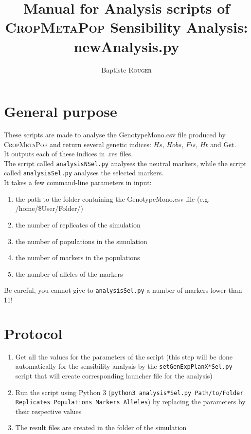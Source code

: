 \documentclass[10pt,a4paper]{article}
\title{Manual for Analysis scripts of \textsc{CropMetaPop} Sensibility Analysis:\\ \textbf{newAnalysis.py}}
\author{Baptiste \textsc{Rouger}}
\begin{document}
\maketitle
\section{General purpose}
These scripts are made to analyse the GenotypeMono.csv file produced by \textsc{CropMetaPop} and return several genetic indices: $\overline{H}s$, $\overline{H}obs$, $\overline{F}is$, $Ht$ and Gst.\\
It outputs each of these indices in .res files.\\

The script called \texttt{analysisNSel.py} analyses the neutral markers, while the script called \texttt{analysisSel.py} analyses the selected markers.\\

It takes a few command-line parameters in input:
\begin{enumerate}
    \item the path to the folder containing the GenotypeMono.csv file (e.g. /home/\$User/Folder/)
    \item the number of replicates of the simulation
    \item the number of populations in the simulation
    \item the number of markers in the populations
    \item the number of alleles of the markers

\end{enumerate}

Be careful, you cannot give to \texttt{analysisSel.py} a number of markers lower than 11!

\section{Protocol}
\begin{enumerate}
        \item Get all the values for the parameters of the script (this step will be done automatically for the sensibility analysis by the \texttt{setGenExpPlanX*Sel.py} script that will create corresponding launcher file for the analysis)
        \item Run the script using Python 3 (\texttt{python3 analysis*Sel.py Path/to/Folder Replicates Populations Markers Alleles}) by replacing the parameters by their respective values
        \item The result files are created in the folder of the simulation
\end{enumerate}
\end{document}
